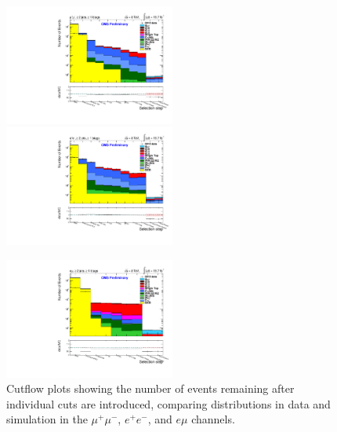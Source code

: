 \begin{figure} [h]
\includegraphics[width=0.5\textwidth]{Plots/ControlPlots/CutFlow/Log/TTbarMuMuRefSelection_splitTTbar_ratio.pdf}
\includegraphics[width=0.5\textwidth]{Plots/ControlPlots/CutFlow/Log/TTbarEERefSelection_splitTTbar_ratio.pdf} \\
\begin{center}
\includegraphics[width=0.5\textwidth]{Plots/ControlPlots/CutFlow/Log/TTbarEMuRefSelection_splitTTbar_ratio.pdf}
\end{center}
\caption{Cutflow plots showing the number of events remaining after individual cuts are introduced, comparing distributions in data and simulation in the $\mu^{+}\mu^{-}$, $e^{+}e^{-}$, and $e\mu$ channels.}
\label{fig-CutFlow}
\end{figure}

